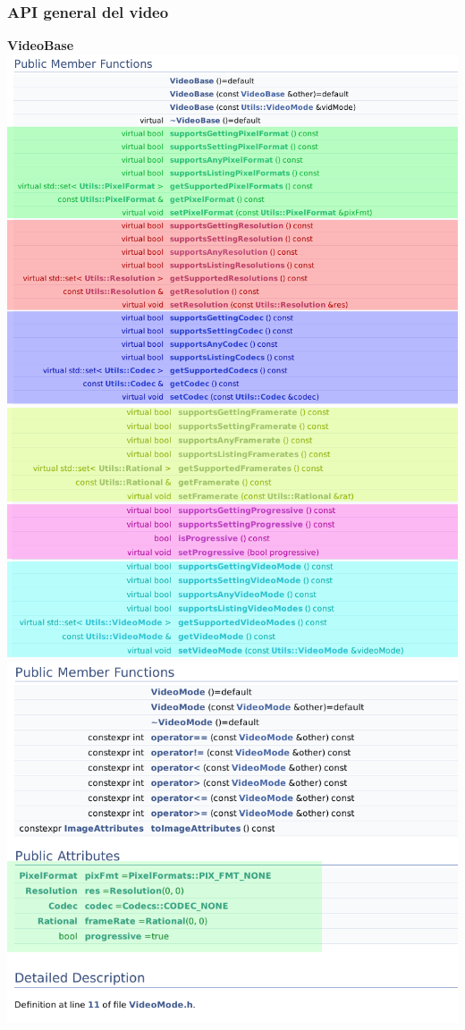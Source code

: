 \documentclass{beamer}
\begin{document}
\begin{frame}[allowframebreaks] \frametitle{API general del video}
\begin{center}
	\center\large\bf VideoBase\\
	\includegraphics[height=0.75\textheight]{video_base1} 
	\includegraphics[width=\textwidth]{video_base2} 
	\includegraphics[height=0.8\textheight]{video_mode_struct} 

\end{center}
\end{frame}
\end{document}

